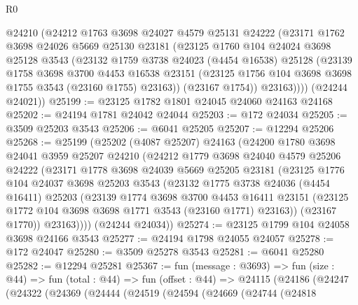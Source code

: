 \begin{lexlean}{R0}
\begin{coremodule}
        @24210
        (@24212
          @1763
          @3698
          @24027
          @4579
          @25131
          @24222
          (@23171
            @1762
            @3698
            @24026
            @5669
            @25130
            @23181
            (@23125
              @1760
              @104
              @24024
              @3698
              @25128
              @3543
              (@23132
                @1759
                @3738
                @24023
                (@4454 @16538)
                @25128
                (@23139
                  @1758
                  @3698
                  @3700
                  @4453
                  @16538
                  @23151
                  (@23125 @1756 @104 @3698 @3698 @1755 @3543 (@23160 @1755) @23163))
                (@23167 @1754))
              @23163))))
      (@24244 @24021))
@25199 := @23125 @1782 @1801 @24045 @24060 @24163 @24168
@25202 := @24194 @1781 @24042 @24044
@25203 := @172 @24034
@25205 := @3509 @25203 @3543
@25206 := @6041 @25205
@25207 := @12294 @25206
@25268 := @25199
    (@25202
      (@4087 @25207)
      @24163
      (@24200
        @1780
        @3698
        @24041
        @3959
        @25207
        @24210
        (@24212
          @1779
          @3698
          @24040
          @4579
          @25206
          @24222
          (@23171
            @1778
            @3698
            @24039
            @5669
            @25205
            @23181
            (@23125
              @1776
              @104
              @24037
              @3698
              @25203
              @3543
              (@23132
                @1775
                @3738
                @24036
                (@4454 @16411)
                @25203
                (@23139
                  @1774
                  @3698
                  @3700
                  @4453
                  @16411
                  @23151
                  (@23125 @1772 @104 @3698 @3698 @1771 @3543 (@23160 @1771) @23163))
                (@23167 @1770))
              @23163))))
      (@24244 @24034))
@25274 := @23125 @1799 @104 @24058 @3698 @24166 @3543
@25277 := @24194 @1798 @24055 @24057
@25278 := @172 @24047
@25280 := @3509 @25278 @3543
@25281 := @6041 @25280
@25282 := @12294 @25281
@25367 := fun (message : @3693) =>
  fun (size : @44) =>
  fun (total : @44) =>
  fun (offset : @44) =>
  @24115
    (@24186
      (@24247
        (@24322
          (@24369
            (@24444
              (@24519
                (@24594
                  (@24669
                    (@24744
                      (@24818

\end{coremodule}
\end{lexlean}
